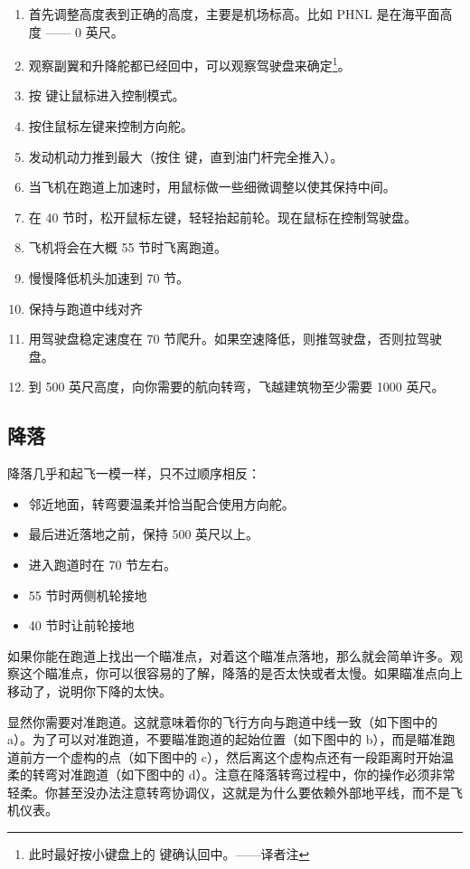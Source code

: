 \begin{itemize}
\begin{enumerate}
  \item 首先调整高度表到正确的高度，主要是机场标高。比如 PHNL 是在海平面高度 —— 0 英尺。
 \item 观察副翼和升降舵都已经回中，可以观察驾驶盘来确定\footnote{此时最好按小键盘上的  键确认回中。——译者注}。
 \item 按  键让鼠标进入控制模式。
 \item 按住鼠标左键来控制方向舵。
 \item 发动机动力推到最大（按住  键，直到油门杆完全推入）。
 \item 当飞机在跑道上加速时，用鼠标做一些细微调整以使其保持中间。
 \item 在 40 节时，松开鼠标左键，轻轻抬起前轮。现在鼠标在控制驾驶盘。
 \item 飞机将会在大概 55 节时飞离跑道。
 \item 慢慢降低机头加速到 70 节。
 \item 保持与跑道中线对齐
 \item 用驾驶盘稳定速度在 70 节爬升。如果空速降低，则推驾驶盘，否则拉驾驶盘。
 \item 到 500 英尺高度，向你需要的航向转弯，飞越建筑物至少需要 1000 英尺。
\end{enumerate}

\subsection{降落}
\label{sec:Ladowanie}

降落几乎和起飞一模一样，只不过顺序相反：

\begin{itemize}
    \item 邻近地面，转弯要温柔并恰当配合使用方向舵。
    \item 最后进近落地之前，保持 500 英尺以上。
    \item 进入跑道时在 70 节左右。
    \item 55 节时两侧机轮接地
    \item 40 节时让前轮接地
\end{itemize}

如果你能在跑道上找出一个瞄准点，对着这个瞄准点落地，那么就会简单许多。观察这个瞄准点，你可以很容易的了解，降落的是否太快或者太慢。如果瞄准点向上移动了，说明你下降的太快。

显然你需要对准跑道。这就意味着你的飞行方向与跑道中线一致（如下图中的 a）。为了可以对准跑道，不要瞄准跑道的起始位置（如下图中的 b），而是瞄准跑道前方一个虚构的点（如下图中的 c），然后离这个虚构点还有一段距离时开始温柔的转弯对准跑道（如下图中的 d）。注意在降落转弯过程中，你的操作必须非常轻柔。你甚至没办法注意转弯协调仪，这就是为什么要依赖外部地平线，而不是飞机仪表。


\end{itemize}
